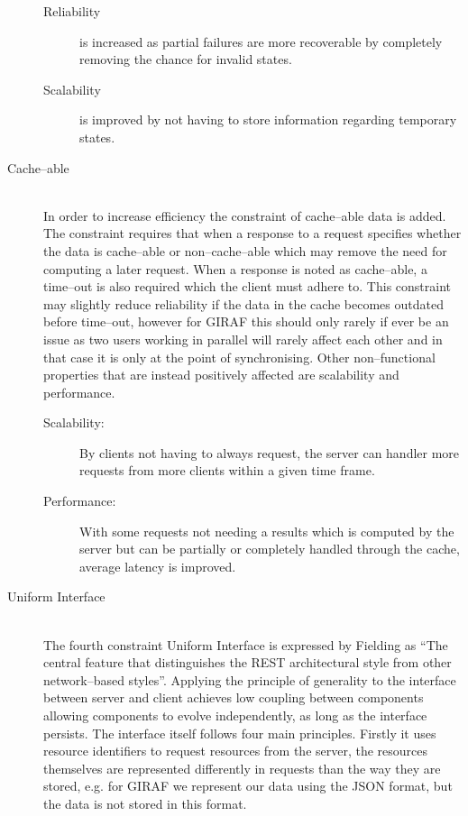 \begin{description}
\begin{description}
        \item[Reliability] is increased as partial failures are more recoverable by completely removing the chance for invalid states.
        \item[Scalability] is improved by not having to store information regarding temporary states.
    \end{description}
    \item [Cache--able] \hfill \\
    In order to increase efficiency the constraint of cache--able data is added.
    The constraint requires that when a response to a request specifies whether the data is cache--able or non--cache--able which may remove the need for computing a later request.
    When a response is noted as cache--able, a time--out is also required which the client must adhere to.
    This constraint may slightly reduce reliability if the data in the cache becomes outdated before time--out, however for GIRAF this should only rarely if ever be an issue as two users working in parallel will rarely affect each other and in that case it is only at the point of synchronising.
    Other non--functional properties that are instead positively affected are scalability and performance.
    \begin{description}
        \item[Scalability:] By clients not having to always request, the server can handler more requests from more clients within a given time frame.
        \item[Performance:] With some requests not needing a results which is computed by the server but can be partially or completely handled through the cache, average latency is improved.
    \end{description}
    \item [Uniform Interface] \hfill \\
    The fourth constraint Uniform Interface is expressed by Fielding as \enquote{The central feature that distinguishes the REST architectural style from other network--based styles}\citep{fielding2000rest}.
    Applying the principle of generality to the interface between server and client achieves low coupling between components allowing components to evolve independently, as long as the interface persists.
    The interface itself follows four main principles.
    Firstly it uses resource identifiers to request resources from the server, the resources themselves are represented differently in requests than the way they are stored, e.g. for GIRAF we represent our data using the JSON format, but the data is not stored in this format.

\end{description}
